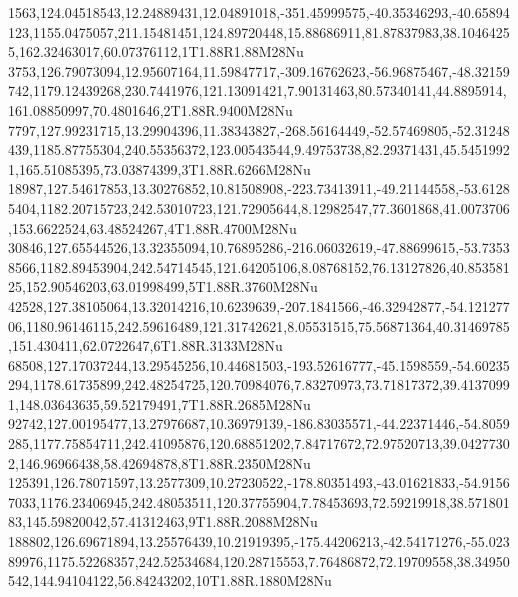 1563,124.04518543,12.24889431,12.04891018,-351.45999575,-40.35346293,-40.65894123,1155.0475057,211.15481451,124.89720448,15.88686911,81.87837983,38.10464255,162.32463017,60.07376112,1T1.88R1.88M28Nu
3753,126.79073094,12.95607164,11.59847717,-309.16762623,-56.96875467,-48.32159742,1179.12439268,230.7441976,121.13091421,7.90131463,80.57340141,44.8895914,161.08850997,70.4801646,2T1.88R.9400M28Nu
7797,127.99231715,13.29904396,11.38343827,-268.56164449,-52.57469805,-52.31248439,1185.87755304,240.55356372,123.00543544,9.49753738,82.29371431,45.54519921,165.51085395,73.03874399,3T1.88R.6266M28Nu
18987,127.54617853,13.30276852,10.81508908,-223.73413911,-49.21144558,-53.61285404,1182.20715723,242.53010723,121.72905644,8.12982547,77.3601868,41.0073706,153.6622524,63.48524267,4T1.88R.4700M28Nu
30846,127.65544526,13.32355094,10.76895286,-216.06032619,-47.88699615,-53.73538566,1182.89453904,242.54714545,121.64205106,8.08768152,76.13127826,40.85358125,152.90546203,63.01998499,5T1.88R.3760M28Nu
42528,127.38105064,13.32014216,10.6239639,-207.1841566,-46.32942877,-54.12127706,1180.96146115,242.59616489,121.31742621,8.05531515,75.56871364,40.31469785,151.430411,62.0722647,6T1.88R.3133M28Nu
68508,127.17037244,13.29545256,10.44681503,-193.52616777,-45.1598559,-54.60235294,1178.61735899,242.48254725,120.70984076,7.83270973,73.71817372,39.41370991,148.03643635,59.52179491,7T1.88R.2685M28Nu
92742,127.00195477,13.27976687,10.36979139,-186.83035571,-44.22371446,-54.8059285,1177.75854711,242.41095876,120.68851202,7.84717672,72.97520713,39.04277302,146.96966438,58.42694878,8T1.88R.2350M28Nu
125391,126.78071597,13.2577309,10.27230522,-178.80351493,-43.01621833,-54.91567033,1176.23406945,242.48053511,120.37755904,7.78453693,72.59219918,38.57180183,145.59820042,57.41312463,9T1.88R.2088M28Nu
188802,126.69671894,13.25576439,10.21919395,-175.44206213,-42.54171276,-55.02389976,1175.52268357,242.52534684,120.28715553,7.76486872,72.19709558,38.34950542,144.94104122,56.84243202,10T1.88R.1880M28Nu
